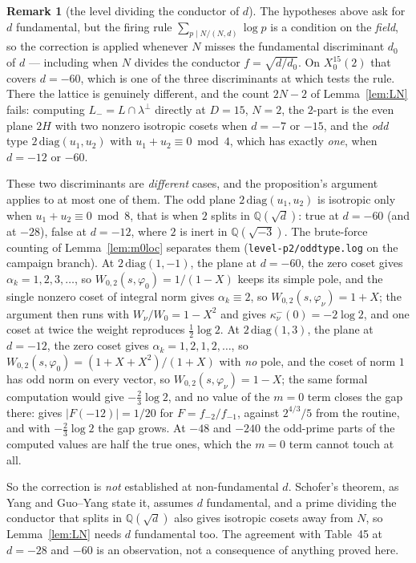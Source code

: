 \documentclass[11pt,reqno]{amsart}
\theoremstyle{plain}
\theoremstyle{definition}
\newtheorem{remark}[theorem]{Remark}
\newcommand{\Q}{\mathbb{Q}}
\newcommand{\Lm}{L_{-}}
\begin{document}
\begin{remark}[the level dividing the conductor of $d$]\label{rem:conductor}
The hypotheses above ask for $d$ fundamental, but the firing rule $\sum_{p\mid N/(N,d)}\log p$ is a
condition on the \emph{field}, so the correction is applied whenever $N$ misses the fundamental
discriminant $d_0$ of $d$ --- including when $N$ divides the conductor $f=\sqrt{d/d_0}$. On
$X_0^{15}(2)$ that covers $d=-60$, which is one of the three discriminants at which
\cite[Table~45]{GY} tests the rule. There the lattice is genuinely different, and the count
$2N-2$ of Lemma~\ref{lem:LN} fails: computing $\Lm=L\cap\lambda^\perp$ directly at $D=15$, $N=2$,
the $2$-part is the even plane $2H$ with two nonzero isotropic cosets when $d=-7$ or $-15$, and the
\emph{odd} type $2\,\mathrm{diag}(u_1,u_2)$ with $u_1+u_2\equiv0\bmod4$, which has exactly \emph{one},
when $d=-12$ or $-60$.

These two discriminants are \emph{different} cases, and the proposition's argument applies to at
most one of them. The odd plane $2\,\mathrm{diag}(u_1,u_2)$ is isotropic only when
$u_1+u_2\equiv0\bmod8$, that is when $2$ splits in $\Q(\sqrt d)$: true at $d=-60$ (and at $-28$),
false at $d=-12$, where $2$ is inert in $\Q(\sqrt{-3})$. The brute-force counting of
Lemma~\ref{lem:m0loc} separates them (\texttt{level-p2/oddtype.log} on the campaign branch). At
$2\,\mathrm{diag}(1,-1)$, the plane at $d=-60$, the zero coset gives $\alpha_k=1,2,3,\dots$, so
$W_{0,2}(s,\varphi_0)=1/(1-X)$ keeps its simple pole, and the single nonzero coset of integral norm
gives $\alpha_k\equiv2$, so $W_{0,2}(s,\varphi_\nu)=1+X$; the argument then runs with
$W_\nu/W_0=1-X^2$ and gives $\kappa^-_\nu(0)=-2\log2$, and one coset at twice the weight reproduces
$\tfrac12\log2$. At $2\,\mathrm{diag}(1,3)$, the plane at $d=-12$, the zero coset gives
$\alpha_k=1,2,1,2,\dots$, so $W_{0,2}(s,\varphi_0)=(1+X+X^2)/(1+X)$ with \emph{no} pole, and the
coset of norm $1$ has odd norm on every vector, so $W_{0,2}(s,\varphi_\nu)=1-X$; the same formal
computation would give $-\tfrac23\log2$, and no value of the $m=0$ term closes the gap there:
\cite[Table~45]{GY} gives $|F(-12)|=1/20$ for $F=f_{-2}/f_{-1}$, against $2^{4/3}/5$ from the
routine, and with $-\tfrac23\log 2$ the gap grows. At $-48$ and $-240$ the odd-prime parts of the
computed values are half the true ones, which the $m=0$ term cannot touch at all.

So the correction is \emph{not} established at non-fundamental $d$. Schofer's theorem, as Yang and
Guo--Yang state it, assumes $d$ fundamental, and a prime dividing the conductor that splits in
$\Q(\sqrt d)$ also gives isotropic cosets away from $N$, so Lemma~\ref{lem:LN} needs $d$ fundamental
too. The agreement with Table~45 at $d=-28$ and $-60$ is an observation, not a consequence of
anything proved here.


\end{remark}
\end{document}
